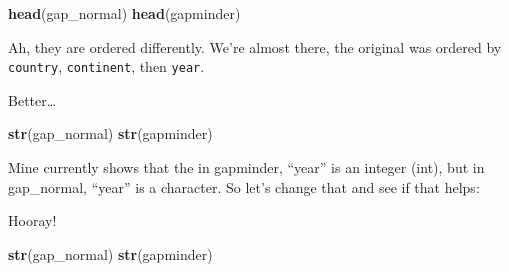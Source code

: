 \documentclass[]{book}
\newenvironment{Shaded}{\begin{snugshade}}{\end{snugshade}}
\newcommand{\KeywordTok}[1]{\textcolor[rgb]{0.13,0.29,0.53}{\textbf{#1}}}
\newcommand{\DataTypeTok}[1]{\textcolor[rgb]{0.13,0.29,0.53}{#1}}
\newcommand{\StringTok}[1]{\textcolor[rgb]{0.31,0.60,0.02}{#1}}
\newcommand{\OperatorTok}[1]{\textcolor[rgb]{0.81,0.36,0.00}{\textbf{#1}}}
\newcommand{\NormalTok}[1]{#1}
\theoremstyle{definition}
\theoremstyle{definition}
\theoremstyle{definition}
\theoremstyle{remark}
\begin{document}
\begin{Shaded}
\begin{Highlighting}[]
\KeywordTok{head}\NormalTok{(gap_normal)}
\KeywordTok{head}\NormalTok{(gapminder)}
\end{Highlighting}
\end{Shaded}

Ah, they are ordered differently. We're almost there, the original was
ordered by \texttt{country}, \texttt{continent}, then \texttt{year}.

\begin{Shaded}
\end{Shaded}

Better\ldots{}

\begin{Shaded}
\begin{Highlighting}[]
\KeywordTok{str}\NormalTok{(gap_normal)}
\KeywordTok{str}\NormalTok{(gapminder)}
\end{Highlighting}
\end{Shaded}

Mine currently shows that the in gapminder, ``year'' is an integer
(int), but in gap\_normal, ``year'' is a character. So let's change that
and see if that helps:

\begin{Shaded}
\end{Shaded}

Hooray!

\begin{Shaded}
\begin{Highlighting}[]
\KeywordTok{str}\NormalTok{(gap_normal)}
\KeywordTok{str}\NormalTok{(gapminder)}
\end{Highlighting}
\end{Shaded}
\end{document}
